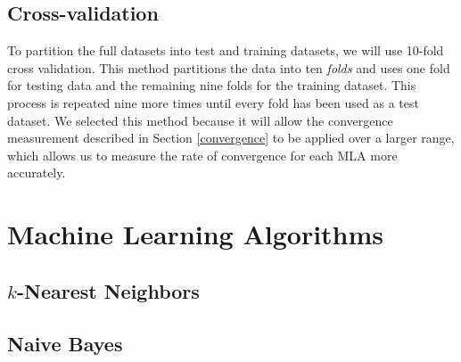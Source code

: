 \documentclass{article}
\begin{document}
		\subsection{Cross-validation}
			To partition the full datasets into test and training datasets, we will use 10-fold cross validation. 
			This method partitions the data into ten \textit{folds} and uses one fold for testing data and the remaining nine folds for the training dataset. 
			This process is repeated nine more times until every fold has been used as a test dataset. 
			We selected this method because it will allow the convergence measurement described in Section \ref{convergence} to be applied over a larger range, which allows us to measure the rate of convergence for each MLA more accurately.
	\section{Machine Learning Algorithms}
		\subsection{$k$-Nearest Neighbors}
		\subsection{Naive Bayes}
			\label{nbw}
\end{document}
